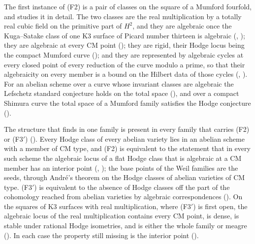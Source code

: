 The first instance of (F2) is a pair of classes on the square of a Mumford
fourfold, and  studies it in detail. The two classes are
the real multiplication by a totally real cubic field on the primitive part of
$H^{2}$, and they are algebraic once the Kuga--Satake class of one K3 surface
of Picard number thirteen is algebraic (,
); they are algebraic at every CM point
(); they are rigid, their Hodge locus being the compact
Mumford curve (); and they are represented by
algebraic cycles at every closed point of every reduction of the curve modulo
a prime, so that their algebraicity on every member is a bound on the Hilbert
data of those cycles (, ). For an
abelian scheme over a curve whose invariant classes are algebraic the
Lefschetz standard conjecture holds on the total space
(), and over a compact Shimura curve the total space
of a Mumford family satisfies the Hodge conjecture
().

The structure that  finds in one family is present in every
family that carries (F2) or (F3$'$) (). Every Hodge class
of every abelian variety lies in an abelian scheme with a member of CM type,
and (F2) is equivalent to the statement that in every such scheme the
algebraic locus of a flat Hodge class that is algebraic at a CM member has an
interior point (, ); the base
points of the Weil families are the seeds, through Andr\'e's theorem on the
Hodge classes of abelian varieties of CM type. (F3$'$) is equivalent to the
absence of Hodge classes off the part of the cohomology reached from abelian
varieties by algebraic correspondences (). On the squares of
K3 surfaces with real multiplication, where (F3$'$) is first open, the
algebraic locus of the real multiplication contains every CM point, is dense,
is stable under rational Hodge isometries, and is either the whole family or
meagre (). In each case the property still missing is the
interior point ().

